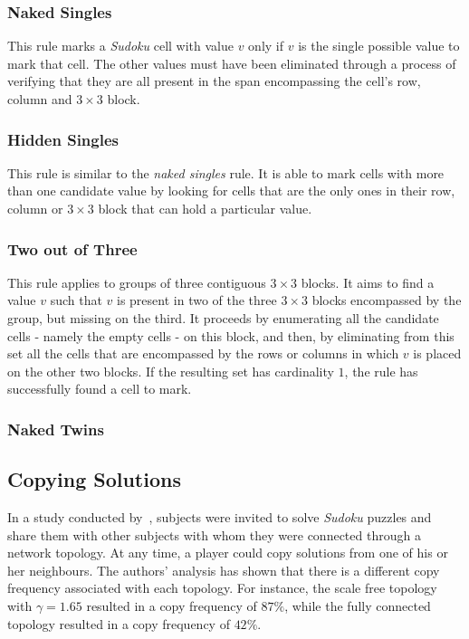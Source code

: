 \documentclass[letterpaper]{article}
\begin{document}
\subsubsection{Naked Singles}

This rule marks a {\em Sudoku} cell with value $v$ only if $v$ is the single possible value to mark that cell. The other values must have been eliminated through a process of verifying that they are all present in the span encompassing the cell's row, column and $3 \times 3$ block.

\subsubsection{Hidden Singles}

This rule is similar to the {\em naked singles} rule. It is able to mark cells with more than one candidate value by looking for cells that are the only ones in their row, column or $3 \times 3$ block that can hold a particular value.

\subsubsection{Two out of Three}

This rule applies to groups of three contiguous $3 \times 3$ blocks. It aims to find a value $v$ such that $v$ is present in two of the three $3 \times 3$ blocks encompassed by the group, but missing on the third. It proceeds by enumerating all the candidate cells - namely the empty cells - on this block, and then, by eliminating from this set all the cells that are encompassed by the rows or columns in which $v$ is placed on the other two blocks. If the resulting set has cardinality $1$, the rule has successfully found a cell to mark.

\subsubsection{Naked Twins}

\subsection{Copying Solutions}

In a study conducted by~\cite{farenzena:collabem}, subjects were invited to solve {\em Sudoku} puzzles and share them with other subjects with whom they were connected through a network topology. At any time, a player could copy solutions from one of his or her neighbours. The authors' analysis has shown that there is a different copy frequency associated with each topology. For instance, the scale free topology with $\gamma = 1.65$ resulted in a copy frequency of $87 \%$, while the fully connected topology resulted in a copy frequency of $42 \%$.
\end{document}
